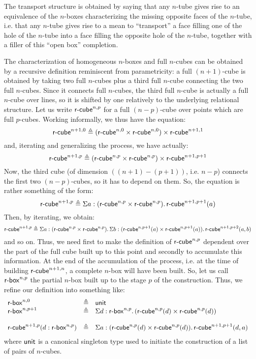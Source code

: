 \documentclass{article}
\newcommand{\defeq}{\triangleq}
\begin{document}
The transport structure is obtained by saying that any $n$-tube gives
rise to an equivalence of the $n$-boxes characterizing the missing
opposite faces of the $n$-tube, i.e. that any $n$-tube gives rise to a
mean to ``transport'' a face filling one of the hole of the $n$-tube
into a face filling the opposite hole of the $n$-tube, together with a
filler of this ``open box'' completion.
\fi

The characterization of homogeneous $n$-boxes and full $n$-cubes can
be obtained by a recursive definition reminiscent from parametricity:
a full $(n+1)$-cube is obtained by taking two full $n$-cubes plus a
third full $n$-cube connecting the two full $n$-cubes. Since it
connects full $n$-cubes, the third full $n$-cube is actually a full
$n$-cube over lines, so it is shifted by one relatively to the
underlying relational structure. Let us write $\mathsf{r\mbox{-}cube}_{}^{n,p}$ for a
full $(n-p)$-cube over points which are full $p$-cubes. Working
informally, we thus have the equation:
$$
\mycube{}^{n+1,0} \defeq (\mycube{}^{n,0} \times \mycube{}^{n,0}) \times \mycube{}^{n+1,1}
$$
and, iterating and generalizing the process, we have actually:
$$
\mycube{}^{n+1,p} \defeq (\mycube{}^{n,p} \times \mycube{}^{n,p}) \times \mycube{}^{n+1,p+1}
$$
Now, the third cube (of dimension $((n+1)-(p+1))$, i.e. $n-p$) connects the first two
$(n-p)$-cubes, so it has to depend on them. So, the equation is rather
something of the form:
$$
\mycube{}^{n+1,p} \defeq \Sigma a:(\mycube{}^{n,p} \times \mycube{}^{n,p}).\, \mycube{}^{n+1,p+1}(a)
$$
Then, by iterating, we obtain:
$$
\mycube{}^{n+1,p} \defeq \Sigma a:(\mycube{}^{n,p} \times \mycube{}^{n,p}).\,
 \Sigma b:(\mycube{}^{n,p+1}(a) \times \mycube{}^{n,p+1}(a)). \, \mycube{}^{n+1,p+2}(a,b)
$$
and so on. Thus, we need first to make the definition of
$\mathsf{r\mbox{-}cube}_{}^{n,p}$ dependent over the part of the full cube built up to
this point and secondly to accumulate this information. At the end of
the accumulation of the process, i.e. at the time of building
$\mathsf{r\mbox{-}cube}_{}^{n+1,n}$, a complete $n$-box will have been built. So, let us
call $\mathsf{r\mbox{-}box}_{}^{n,p}$ the partial $n$-box built up to the stage $p$
of the construction. Thus, we refine our definition into something like:
$$
\begin{array}{lll}
\mybox{}^{n,0} &\defeq& \unittype\\
\mybox{}^{n,p+1} &\defeq& \Sigma d:\mybox{}^{n,p}.\,(\mycube{}^{n,p}(d) \times \mycube{}^{n,p}(d))\\
\\
\mycube{}^{n+1,p}(d:\mybox{}^{n,p}) &\defeq& \Sigma a:(\mycube{}^{n,p}(d) \times \mycube{}^{n,p}(d)).\,\mycube{}^{n+1,p+1}(d,a)
\end{array}
$$
where $\mathsf{unit}$ is a canonical singleton type used to initiate the
construction of a list of pairs of $n$-cubes.
\end{document}
